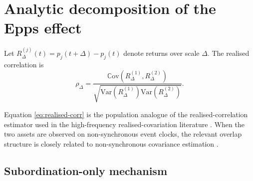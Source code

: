 \documentclass[5p,final]{elsarticle}
\newcommand{\Var}{\mbox{Var}}
\newcommand{\Cov}{\mathbb{C}\mathrm{ov}}
\begin{document}

\section{Analytic decomposition of the Epps effect}

Let $R^{(j)}_\Delta(t)=p_j(t+\Delta)-p_j(t)$ denote returns over scale $\Delta$.
The realised correlation \cite{BarndorffNielsenShephard2004RealizedCovariation} is
\begin{equation}
 \rho_\Delta=\frac{\Cov(R^{(1)}_\Delta,R^{(2)}_\Delta)}{
 \sqrt{\Var(R^{(1)}_\Delta)\Var(R^{(2)}_\Delta)}}. \label{eq:realised-corr}
\end{equation}

Equation \eqref{eq:realised-corr} is the population analogue of the realised-correlation estimator used in the high-frequency realised-covariation literature \citep{BarndorffNielsenShephard2004RealizedCovariation}. When the two assets are observed on non-synchronous event clocks, the relevant overlap structure is closely related to non-synchronous covariance estimation \citep{hayashi2005}.


\subsection{Subordination-only mechanism}
\end{document}
